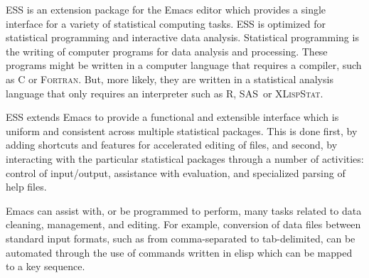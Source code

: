 \documentclass{article}
\newcommand*{\SAS}{\textsc{SAS}}
\newcommand*{\XLispStat}{\textsc{XLispStat}}
\newcommand*{\Fortran}{\textsc{Fortran}}
\begin{document}
ESS is an extension package for the Emacs editor which provides a
single interface for a variety of statistical computing tasks.  ESS is
optimized for statistical programming and interactive data analysis.
Statistical programming is the writing of computer programs for data
analysis and processing.  These programs might be written in a
computer language that requires a compiler, such as C or \Fortran.
But, more likely, they are written in a statistical analysis language 
that only requires an interpreter such as R, \SAS\ or \XLispStat.

ESS extends Emacs to provide a functional and extensible interface
which is uniform and consistent across multiple statistical packages.
This is done first, by adding shortcuts and features for accelerated
editing of files, and second, by interacting with the particular
statistical packages through a number of activities: control of
input/output, assistance with evaluation, and specialized parsing of
help files.

Emacs can assist with, or be
programmed to perform, many tasks related to data cleaning,
management, and editing.  For example, conversion of data files
between standard input formats, such as from comma-separated to
tab-delimited, can be automated through the use of commands written in
elisp which can be mapped to a key sequence.
\end{document}
